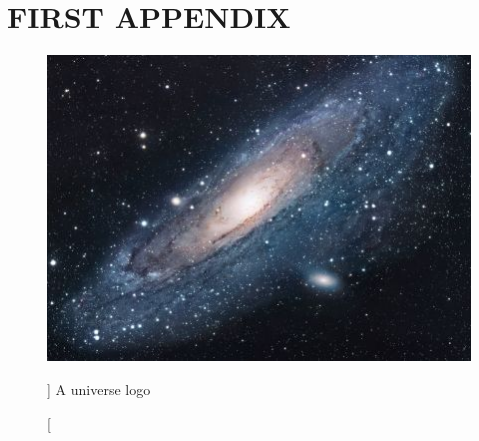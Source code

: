 

\chapter{FIRST APPENDIX}\label{Appendix 1}

\begin{figure}
    \centering
    \includegraphics[scale=3]{pic/appendices/universe.jpg}
    \caption%
    []
    {A universe logo}
    \label{fig:universelogo}
\end{figure}